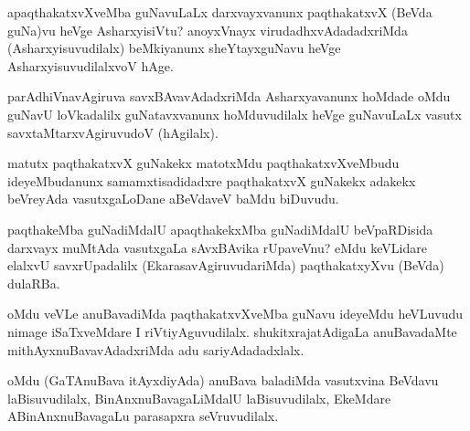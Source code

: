 \begin{artha}
apaqthakatxvXveMba guNavuLaLx darxvayxvanunx paqthakatxvX (BeVda guNa)vu heVge AsharxyisiVtu?  anoyxVnayx virudadhxvAdadadxriMda (Asharxyisuvudilalx) beMkiyanunx sheYtayxguNavu heVge AsharxyisuvudilalxvoV hAge.
\end{artha}


\begin{artha}
parAdhiVnavAgiruva savxBAvavAdadxriMda Asharxyavanunx hoMdade oMdu guNavU loVkadalilx guNatavxvanunx hoMduvudilalx heVge guNavuLaLx vasutx savxtaMtarxvAgiruvudoV (hAgilalx).
\end{artha}

\begin{artha}
matutx paqthakatxvX guNakekx matotxMdu paqthakatxvXveMbudu ideyeMbudanunx samamxtisadidadxre paqthakatxvX guNakekx adakekx beVreyAda vasutxgaLoDane aBeVdaveV baMdu biDuvudu.
\end{artha}


\begin{artha}
paqthakeMba guNadiMdalU apaqthakekxMba guNadiMdalU beVpaRDisida darxvayx muMtAda vasutxgaLa sAvxBAvika rUpaveVnu? eMdu keVLidare elalxvU savxrUpadalilx (EkarasavAgiruvudariMda) paqthakatxyXvu (BeVda) dulaRBa.
\end{artha}


\begin{artha}
oMdu veVLe anuBavadiMda paqthakatxvXveMba guNavu ideyeMdu heVLuvudu nimage iSaTxveMdare I riVtiyAguvudilalx. shukitxrajatAdigaLa anuBavadaMte mithAyxnuBavavAdadxriMda adu sariyAdadadxlalx.
\end{artha}

\begin{artha}
oMdu (GaTAnuBava itAyxdiyAda) anuBava baladiMda vasutxvina BeVdavu laBisuvudilalx, BinAnxnuBavagaLiMdalU laBisuvudilalx, EkeMdare ABinAnxnuBavagaLu parasapxra seVruvudilalx.
\end{artha}

